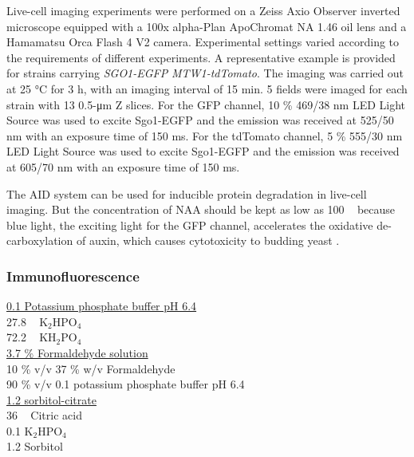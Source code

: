 Live-cell imaging experiments were performed on a Zeiss Axio Observer inverted microscope equipped with a 100x alpha-Plan ApoChromat NA 1.46 oil lens and a Hamamatsu Orca Flash 4 V2 camera. Experimental settings varied according to the requirements of different experiments. A representative example is provided for strains carrying \textit{SGO1-EGFP} \textit{MTW1-tdTomato}. The imaging was carried out at 25 \si{\celsius} for 3 \si{\hour}, with an imaging interval of 15 \si{\minute}. 5 fields were imaged for each strain with 13 0.5-\si{\micro\metre} Z slices. For the GFP channel, 10 \% 469/38 \si{\nano\metre} LED Light Source was used to excite Sgo1-EGFP and the emission was received at 525/50 \si{\nano\metre} with an exposure time of 150 \si{\milli\second}. For the tdTomato channel, 5 \% 555/30 \si{\nano\metre} LED Light Source was used to excite Sgo1-EGFP and the emission was received at 605/70 \si{\nano\metre} with an exposure time of 150 \si{\milli\second}. 

The AID system can be used for inducible protein degradation in live-cell imaging. But the concentration of NAA should be kept as low as 100 \si{\micro\Molar} because blue light, the exciting light for the GFP channel, accelerates the oxidative de-carboxylation of auxin, which causes cytotoxicity to budding yeast \citep{Papagiannakis2017QuantitativeCells}. 


\subsubsection{Immunofluorescence}

\underline{0.1 \si{\Molar} Potassium phosphate buffer pH 6.4}\\
27.8 \si{\milli\Molar} K$_{2}$HPO$_{4}$ \\
72.2 \si{\milli\Molar} KH$_{2}$PO$_{4}$ \\

\underline{3.7 \% Formaldehyde solution}\\
10 \% v/v 37 \% w/v Formaldehyde\\
90 \% v/v 0.1 \si{\Molar} potassium phosphate buffer pH 6.4\\

\underline{1.2 \si{\Molar} sorbitol-citrate}\\
36 \si{\milli\Molar} Citric acid\\
0.1 \si{\Molar} K$_{2}$HPO$_{4}$\\
1.2 \si{\Molar} Sorbitol\\

